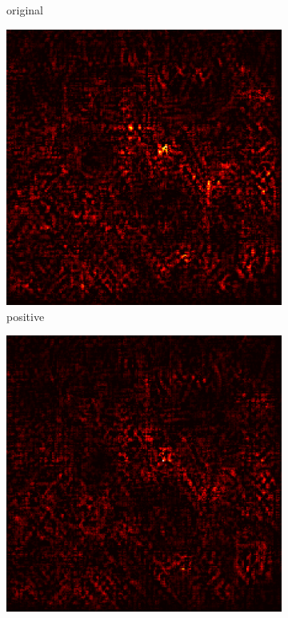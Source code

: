 \documentclass[preprint,12pt]{elsarticle}
\begin{document}
\begin{figure}
\begin{subfigure}{0.14\linewidth}
        \caption{original}
    \end{subfigure}
    \hfill
    \begin{subfigure}{0.14\textwidth}
        \centering
        \includegraphics[width=\linewidth]{../visualizations/examples/imagenette/resnet18/positive_saliency_map/2.png}
        \caption{positive}
    \end{subfigure}
    \hfill
    \begin{subfigure}{0.14\textwidth}
        \centering
        \includegraphics[width=\linewidth]{../visualizations/examples/imagenette/resnet18/negative_saliency_map/2.png}

\end{subfigure}
\end{figure}
\end{document}
